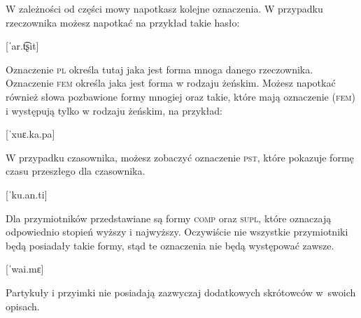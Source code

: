 W zależności od części mowy napotkasz kolejne oznaczenia. W przypadku rzeczownika możesz napotkać na przykład takie hasło:

[ˈar.t͡ʂit]
\skipline

Oznaczenie \textsc{pl} określa tutaj jaka jest forma mnoga danego rzeczownika. Oznaczenie \textsc{fem} określa jaka jest forma w rodzaju żeńskim. Możesz napotkać również słowa pozbawione formy mnogiej oraz takie, które mają oznaczenie (\textsc{fem}) i występują tylko w rodzaju żeńskim, na przykład:

[ˈxuɛ.ka.pa]
\skipline

W przypadku czasownika, możesz zobaczyć oznaczenie \textsc{pst}, które pokazuje formę czasu przeszłego dla czasownika.

[ˈku.an.ti]
\skipline

Dla przymiotników przedstawiane są formy \textsc{comp} oraz \textsc{supl}, które oznaczają odpowiednio stopień wyższy i najwyższy. Oczywiście nie wszystkie przymiotniki będą posiadały takie formy, stąd te oznaczenia nie będą występować zawsze.

[ˈwai.mɛ]
\skipline

Partykuły i przyimki nie posiadają zazwyczaj dodatkowych skrót\-owców w~swoich opisach.

\skipline